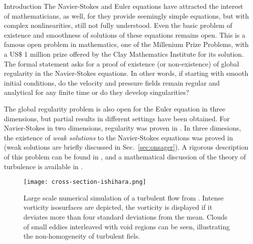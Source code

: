 \begin{chapter}{Introduction}
The Navier-Stokes and Euler equations have attracted the interest of
mathematicians, as well, for they provide seemingly simple equations,
but with complex nonlinearities, still not fully understood.
Even the basic problem of existence and smoothness of solutions of these
equations remains open. This is a famous open problem
in mathematics, one of the Millenium Prize Problems,
with a US\$ 1 million prize offered by the Clay Mathematics Institute
for its solution. The formal statement asks for a proof of existence (or non-existence) of global regularity in the Navier-Stokes equations. In other words, if starting with smooth initial conditions, do the velocity and pressure fields remain regular and analytical for any finite time or do they develop singularities?

The global regularity problem is also open for the Euler equation in three dimensions, but partial results in different settings have been obtained. For Navier-Stokes in two dimensions, regularity was proven in \textcite{ladyzhenskaya1969mathematical}.
In three dimesions, the existence of \textit{weak solutions} to the Navier-Stokes equations was proved in \textcite{leray1934} (weak solutions are briefly discussed in Sec.~\ref{sec:onsager}).
A rigorous description of this problem can be found
in \textcite{fefferman2006existence}, and a mathematical discussion
of the theory of turbulence is available in \textcite{temam2001}.

\begin{figure}[t]
    \centering
    \texttt{[image: cross-section-ishihara.png]}
    \caption[Intense vorticity isosurfaces in a large-scale DNS]
    {Large scale numerical simulation of a turbulent flow from \textcite{ishihara2009}.
    Intense vorticity isosurfaces are depicted, the vorticity is
    displayed if it deviates more than four standard deviations from the mean. Clouds of small eddies interleaved with void regions can be seen, illustrating the non-homogeneity of turbulent fiels.}
    \label{fig:cross-section}
\end{figure}


\end{chapter}
